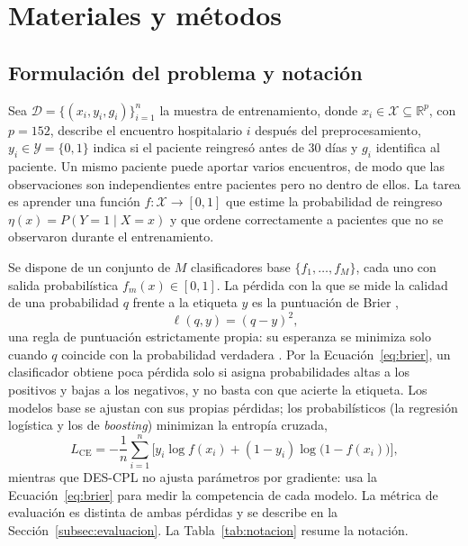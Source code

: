 \documentclass[pdflatex,sn-mathphys-num]{sn-jnl}
\theoremstyle{plain}
\begin{document}
\section{Materiales y métodos}\label{sec:metodologia}

\subsection{Formulación del problema y notación}\label{subsec:formulacion}

Sea $\mathcal{D}=\{(x_i, y_i, g_i)\}_{i=1}^{n}$ la muestra de entrenamiento, donde $x_i \in \mathcal{X} \subseteq \mathbb{R}^{p}$, con $p=152$, describe el encuentro hospitalario $i$ después del preprocesamiento, $y_i \in \mathcal{Y}=\{0,1\}$ indica si el paciente reingresó antes de 30 días y $g_i$ identifica al paciente. Un mismo paciente puede aportar varios encuentros, de modo que las observaciones son independientes entre pacientes pero no dentro de ellos. La tarea es aprender una función $f:\mathcal{X}\to[0,1]$ que estime la probabilidad de reingreso $\eta(x)=P(Y=1\mid X=x)$ y que ordene correctamente a pacientes que no se observaron durante el entrenamiento.

Se dispone de un conjunto de $M$ clasificadores base $\{f_1,\dots,f_M\}$, cada uno con salida probabilística $f_m(x)\in[0,1]$. La pérdida con la que se mide la calidad de una probabilidad $q$ frente a la etiqueta $y$ es la puntuación de Brier \cite{bib_brier},
\begin{equation}
\ell(q, y) = (q - y)^2,
\label{eq:brier}
\end{equation}
una regla de puntuación estrictamente propia: su esperanza se minimiza solo cuando $q$ coincide con la probabilidad verdadera \cite{bib_gneiting_2007}. Por la Ecuación~\eqref{eq:brier}, un clasificador obtiene poca pérdida solo si asigna probabilidades altas a los positivos y bajas a los negativos, y no basta con que acierte la etiqueta. Los modelos base se ajustan con sus propias pérdidas; los probabilísticos (la regresión logística y los de \emph{boosting}) minimizan la entropía cruzada,
\begin{equation}
L_{\text{CE}} = -\frac{1}{n}\sum_{i=1}^{n}\Big[y_i\log f(x_i) + (1-y_i)\log\big(1-f(x_i)\big)\Big],
\label{eq:entropia}
\end{equation}
mientras que DES-CPL no ajusta parámetros por gradiente: usa la Ecuación~\eqref{eq:brier} para medir la competencia de cada modelo. La métrica de evaluación es distinta de ambas pérdidas y se describe en la Sección~\ref{subsec:evaluacion}. La Tabla~\ref{tab:notacion} resume la notación.
\end{document}
